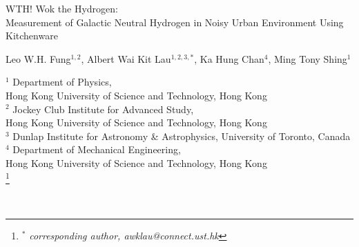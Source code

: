 \documentclass[12pt]{article}
\newcommand\blfootnote[1]{%
  \begingroup
  \renewcommand\thefootnote{}\footnote{#1}%
  \addtocounter{footnote}{-1}%
  \endgroup
}
\begin{document}
	
	\begin{titlepage}
		
		\setcounter{page}{0}
		
		
		
		
		
		
		
		\vskip 1cm
		\begin{center}
			
			
			\vskip 1cm
			
            {\Large WTH! Wok the Hydrogen: \\Measurement of Galactic Neutral Hydrogen in Noisy Urban Environment Using Kitchenware}
			
			\vskip 0.6cm
			 
			{Leo W.H. Fung${}^{1,2}$}, Albert Wai Kit Lau${}^{1,2,3,*}$, {Ka Hung Chan${}^{4}$}, {Ming Tony Shing${}^{1}$}
			
			\vskip 0.6cm
			
			
			${}^1$ Department of Physics, \\
			Hong Kong University of Science and Technology, Hong Kong \\
            ${}^2$ Jockey Club Institute for Advanced Study, \\
			Hong Kong University of Science and Technology, Hong Kong \\
			${}^3$ Dunlap Institute for Astronomy \& Astrophysics, University of Toronto, Canada \\
            ${}^4$ Department of Mechanical Engineering, \\
			Hong Kong University of Science and Technology, Hong Kong \\
            \blfootnote{${}^*$ \textit{corresponding author, awklau@connect.ust.hk}} \\
			
			

\end{center}
\end{titlepage}
\end{document}
